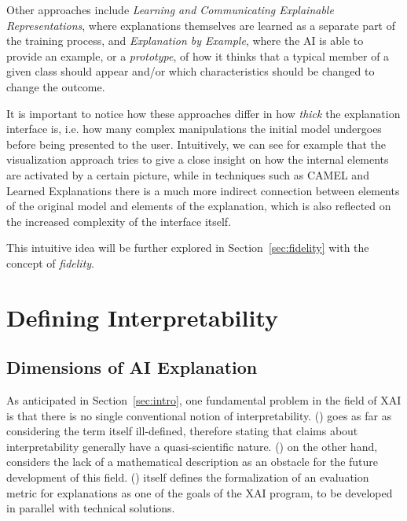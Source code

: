\documentclass[conference]{IEEEtran}
\begin{document}

Other approaches include \textit{Learning and Communicating Explainable
    Representations}, where explanations themselves are learned as a separate
part of the training process, and \textit{Explanation by Example}, where the
AI is able to provide an example, or a \textit{prototype}, of how it thinks
that a typical member of a given class should appear and/or which
characteristics should be changed to change the outcome.


It is important to notice how these approaches differ in how \textit{thick} the explanation interface is, i.e. how many complex manipulations the initial model undergoes before being presented to the user. Intuitively, we can see for example that the visualization approach tries to give a close insight on how the internal elements are activated by a certain picture,
while in techniques such as CAMEL and Learned Explanations there is a much more
indirect connection between elements of the original model and elements of the
explanation, which is also reflected on the increased complexity of the
interface itself.

This intuitive idea will be further explored in
Section~\ref{sec:fidelity} with the concept of \textit{fidelity}.

\section{Defining Interpretability}
\label{sec:explainability}

\subsection{Dimensions of AI Explanation}
\label{sec:dim}

As anticipated in Section~\ref{sec:intro}, one fundamental problem in the field
of XAI is that there is no single conventional notion of interpretability.
(\cite{mythos}) goes as far as considering the term itself ill-defined, therefore
stating that claims about interpretability generally have a quasi-scientific
nature. (\cite{Giannotti}) on the other hand, considers the lack of a
mathematical description as an obstacle for the future development of this
field. (\cite{DARPA}) itself defines the formalization of an evaluation metric
for explanations as one of the goals of the XAI program, to be developed in
parallel with technical solutions.
\end{document}
